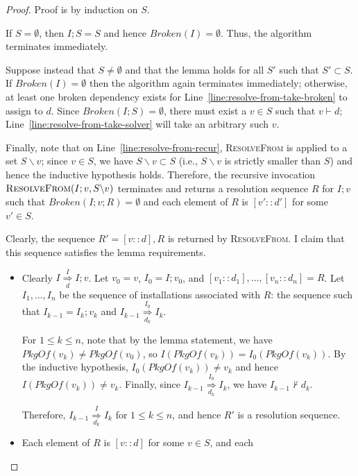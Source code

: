 \documentclass[letterpaper]{article}
\theoremstyle{definition}
\theoremstyle{remark}
\newcommand{\pkgof}[1]{PkgOf(#1)}
\newcommand{\nsol}[2]{\overset{#1}{\underset{#2}{\Rightarrow}}}
\newcommand{\act}[2]{[#1 :: #2]}
\newcommand{\satisfies}{\vdash}
\begin{document}
\begin{proof}
  Proof is by induction on $S$.

  If $S=\emptyset$, then $I;S=S$ and hence $Broken(I)=\emptyset$.
  Thus, the algorithm terminates immediately.

  Suppose instead that $S \neq \emptyset$ and that the lemma holds for
  all $S'$ such that $S' \subset S$.  If $Broken(I)=\emptyset$ then
  the algorithm again terminates immediately; otherwise, at least one
  broken dependency exists for
  Line~\ref{line:resolve-from-take-broken} to assign to $d$.  Since
  $Broken(I;S)=\emptyset$, there must exist a $v \in S$ such that $v
  \satisfies d$; Line~\ref{line:resolve-from-take-solver} will take an
  arbitrary such $v$.

  Finally, note that on Line~\ref{line:resolve-from-recur},
  \textsc{ResolveFrom} is applied to a set $S \backslash v$; since $v
  \in S$, we have $S \backslash v \subset S$ (i.e., $S \backslash v$
  is strictly smaller than $S$) and hence the inductive hypothesis
  holds.  Therefore, the recursive invocation $\Call{ResolveFrom}{I;v,
    S \backslash v}$ terminates and returns a resolution sequence $R$
  for $I;v$ such that $Broken(I;v;R)=\emptyset$ and each element of
  $R$ is $\act{v'}{d'}$ for some $v' \in S$.

  Clearly, the sequence $R'=\act{v}{d},R$ is returned by
  \textsc{ResolveFrom}.  I claim that this sequence satisfies the
  lemma requirements.

  \begin{itemize}
  \item Clearly $I \nsol{I}{d} I;v$.  Let $v_0 = v$, $I_0 = I;v_0$,
    and $\act{v_1}{d_1}, \dots, \act{v_n}{d_n} = R$.  Let
    $I_1,\dots,I_n$ be the sequence of installations associated with
    $R$: the sequence such that $I_{k-1}=I_k;v_k$ and $I_{k-1}
    \nsol{I_0}{d_k} I_k$.

    For $1 \leq k \leq n$, note that by the lemma statement, we have
    $\pkgof{v_k} \neq \pkgof{v_0}$, so $I(\pkgof{v_k}) =
    I_0(\pkgof{v_k})$.  By the inductive hypothesis, $I_0(\pkgof{v_k})
    \neq v_k$ and hence $I(\pkgof{v_k}) \neq v_k$.  Finally, since
    $I_{k-1} \nsol{I_0}{d_k} I_k$, we have $I_{k-1} \not \satisfies
    d_k$.

    Therefore, $I_{k-1} \nsol{I}{d_k} I_k$ for $1 \leq k \leq n$, and
    hence $R'$ is a resolution sequence.

  \item Each element of $R$ is $\act{v}{d}$ for some $v \in S$, and
    each
  \end{itemize}
\end{proof}
\end{document}

